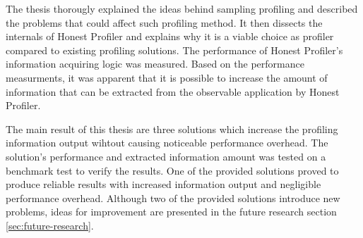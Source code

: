 \documentclass[..thesis.tex]{subfiles}
\begin{document}
The thesis thorougly explained the ideas behind sampling profiling and described the problems that could affect such profiling method. It then dissects the internals of Honest Profiler and explains why it is a viable choice as profiler compared to existing profiling solutions. The performance of Honest Profiler's information acquiring logic was measured. Based on the performance measurments, it was apparent that it is possible to increase the amount of information that can be extracted from the observable application by Honest Profiler.

The main result of this thesis are three solutions which increase the profiling information output wihtout causing noticeable performance overhead. The solution's performance and extracted information amount was tested on a benchmark test to verify the results. One of the provided solutions proved to produce reliable results with increased information output and negligible performance overhead. Although two of the provided solutions introduce new problems, ideas for improvement are presented in the future research section \ref{sec:future-research}.

\end{document}
